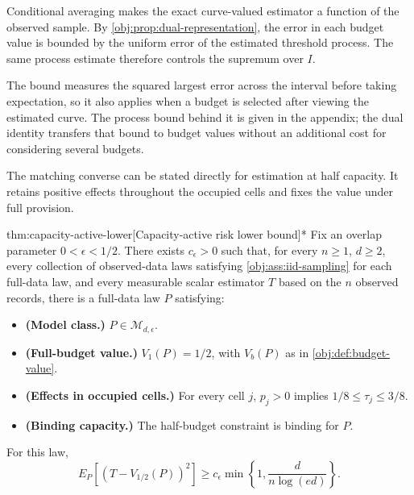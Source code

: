 \documentclass[11pt]{article}
\begin{document}
Conditional averaging makes the exact curve-valued estimator a function of the observed sample. By \cref{obj:prop:dual-representation}, the error in each budget value is bounded by the uniform error of the estimated threshold process. The same process estimate therefore controls the supremum over \(I\).



The bound measures the squared largest error across the interval before taking expectation, so it also applies when a budget is selected after viewing the estimated curve. The process bound behind it is given in the appendix; the dual identity transfers that bound to budget values without an additional cost for considering several budgets.

The matching converse can be stated directly for estimation at half capacity. It retains positive effects throughout the occupied cells and fixes the value under full provision.

\begin{theoremv}{thm:capacity-active-lower}[Capacity-active risk lower bound]*
Fix an overlap parameter \(0<\epsilon<1/2\). There exists \(c_\epsilon>0\) such that, for every \(n\geq1\), \(d\geq2\), every collection of observed-data laws satisfying \cref{obj:ass:iid-sampling} for each full-data law, and every measurable scalar estimator \(T\) based on the \(n\) observed records, there is a full-data law \(P\) satisfying:
\begin{itemize}
\item \textbf{(Model class.)} \(P\in\mathcal M_{d,\epsilon}\).
\item \textbf{(Full-budget value.)} \(V_1(P)=1/2\), with \(V_b(P)\) as in \cref{obj:def:budget-value}.
\item \textbf{(Effects in occupied cells.)} For every cell \(j\), \(p_j>0\) implies \(1/8\leq\tau_j\leq3/8\).
\item \textbf{(Binding capacity.)} The half-budget constraint is binding for \(P\).
\end{itemize}
For this law,
\[
E_P\!\left[(T-V_{1/2}(P))^2\right]
\geq c_\epsilon\min\left\{1,\frac{d}{n\log(ed)}\right\}.
\]
\end{theoremv}
\end{document}
